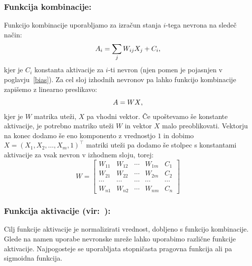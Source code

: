 \documentclass[mat1]{fmfdelo}
\begin{document}
\subsubsection{Funkcija kombinacije:}
Funkcijo kombinacije uporabljamo za izračun stanja $i$-tega nevrona na sledeč način:
%
\begin{equation*}
A_i= \sum_{j}W_{ij}X_j + C_i \text,
\end{equation*}
%
kjer je  $C_i$ konstanta aktivacije za $i$-ti nevron (njen pomen je pojasnjen v poglavju~\ref{bias}). 
Za cel sloj izhodnih nevronov pa lahko funkcijo kombinacije zapišemo z linearno preslikavo:
%
\begin{equation*}
A = WX \text,
\end{equation*}
%
kjer je $W$ matrika uteži, $X$ pa vhodni vektor. Če upoštevamo še konstante aktivacije, je potrebno matriko uteži $W$ in vektor $X$ malo preoblikovati. Vektorju na konec dodamo še eno komponento z vrednostjo $1$ in dobimo $X =  (X_1, X_2, \dotso, X_m, 1)^\intercal $ matriki uteži pa dodamo še stolpec s konstantami aktivacije za vsak nevron v izhodnem sloju, torej: 
%
\begin{equation*}
W = \begin{bmatrix}
W_{11} &W_{12}  & \cdots & W_{1m}  & C_1\\
W_{21}  &W_{22}  &\cdots & W_{2m}  & C_2\\
\cdots &\cdots  &\cdots &\cdots  &\cdots\\
W_{n1} & W_{n2} & \cdots & W_{nm} & C_n
\end{bmatrix}  
\end{equation*}
%
\subsubsection{Funkcija aktivacije (vir:~\cite{fact}):}
Cilj funkcije aktivacije je normalizirati vrednost, dobljeno s funkcijo kombinacije. Glede na namen uporabe nevronske mreže lahko uporabimo različne funkcije aktivacije. Najpogosteje se uporabljata stopničasta pragovna funkcija ali pa sigmoidna funkcija. 
\end{document}
